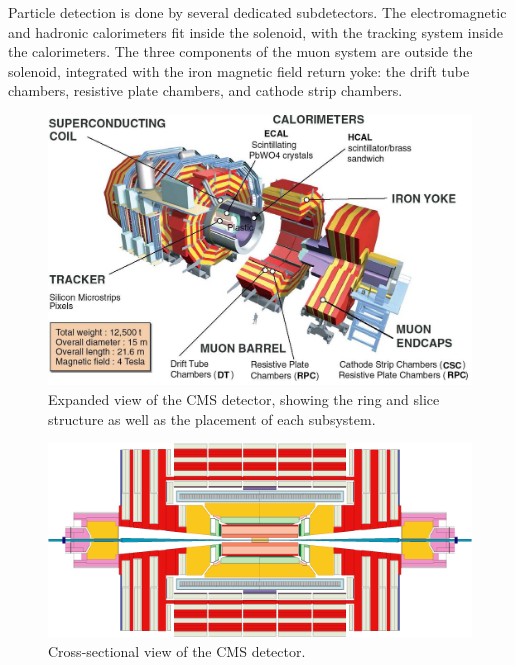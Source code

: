 Particle detection is done by several dedicated subdetectors.  
The electromagnetic and hadronic calorimeters fit inside the solenoid, 
with the tracking system inside the calorimeters.  
The three components of the muon system are outside the solenoid,
integrated with the iron magnetic field return yoke:
the drift tube chambers, resistive plate chambers,
and cathode strip chambers.  


 \begin{figure}[htb]
  \begin{center}
    \includegraphics[width=360pt]{Figures/CMSncLabels.png}
  \end{center}
  \caption[Expanded view of the CMS detector]{Expanded view of the CMS detector, showing the ring and slice structure as well as the placement of each subsystem.}
  \label{fig:CMSDiagram3D}
 \end{figure}

 \begin{figure}[htb]
  \begin{center}
    \includegraphics[width=360pt]{Figures/Longnc.png}
  \end{center}
  \caption[Cross-sectional view of the CMS detector]{Cross-sectional view of the CMS detector.}
  \label{fig:CMSDiagramFlat}
 \end{figure}

